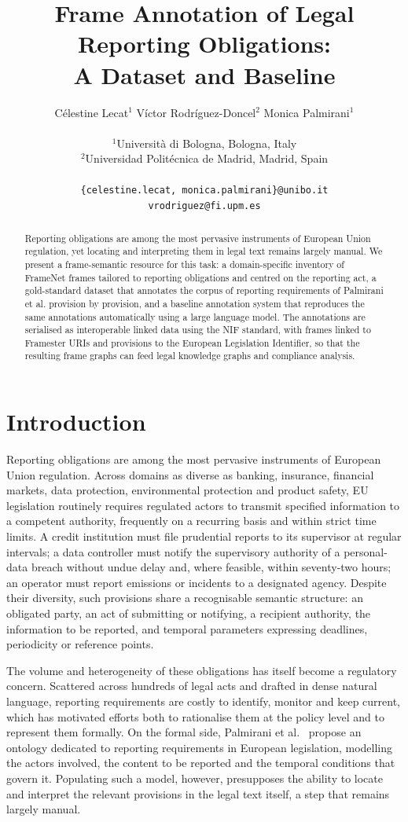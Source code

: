 \documentclass[10pt, a4paper, twocolumn]{article}
\title{\textbf{Frame Annotation of Legal Reporting Obligations:\\
A Dataset and Baseline}}
\author{
  Célestine Lecat$^{1}$ \quad Víctor Rodríguez-Doncel$^{2}$ \quad Monica Palmirani$^{1}$ \\
  \\
  $^{1}$Università di Bologna, Bologna, Italy \\
  $^{2}$Universidad Politécnica de Madrid, Madrid, Spain \\
  \\
  \texttt{\{celestine.lecat, monica.palmirani\}@unibo.it} \\
  \texttt{vrodriguez@fi.upm.es}
}
\date{}
\begin{document}
\maketitle

\begin{abstract}
Reporting obligations are among the most pervasive instruments of European Union
regulation, yet locating and interpreting them in legal text remains largely
manual. We present a frame-semantic resource for this task: a domain-specific
inventory of FrameNet frames tailored to reporting obligations and centred on the
reporting act, a gold-standard dataset that annotates the corpus of reporting
requirements of Palmirani et al. provision by provision, and a baseline
annotation system that reproduces the same annotations automatically using a
large language model. The annotations are serialised as interoperable linked data
using the NIF standard, with frames linked to Framester URIs and provisions to
the European Legislation Identifier, so that the resulting frame graphs can feed
legal knowledge graphs and compliance analysis.
\end{abstract}

\section{Introduction}
\label{sec:intro}

Reporting obligations are among the most pervasive instruments of European
Union regulation. Across domains as diverse as banking, insurance, financial
markets, data protection, environmental protection and product safety, EU
legislation routinely requires regulated actors to transmit specified
information to a competent authority, frequently on a recurring basis and
within strict time limits. A credit institution must file prudential reports to
its supervisor at regular intervals; a data controller must notify the
supervisory authority of a personal-data breach without undue delay and, where
feasible, within seventy-two hours; an operator must report emissions or
incidents to a designated agency. Despite their diversity, such provisions
share a recognisable semantic structure: an obligated party, an act of
submitting or notifying, a recipient authority, the information to be reported,
and temporal parameters expressing deadlines, periodicity or reference points.

The volume and heterogeneity of these obligations has itself become a
regulatory concern. Scattered across hundreds of legal acts and drafted in
dense natural language, reporting requirements are costly to identify, monitor
and keep current, which has motivated efforts both to rationalise them at the
policy level and to represent them formally. On the formal side, Palmirani et
al.~\cite{palmirani-2025-reporting} propose an ontology dedicated to reporting
requirements in European legislation, modelling the actors involved, the
content to be reported and the temporal conditions that govern it. Populating
such a model, however, presupposes the ability to locate and interpret the
relevant provisions in the legal text itself, a step that remains largely
manual.
\end{document}
